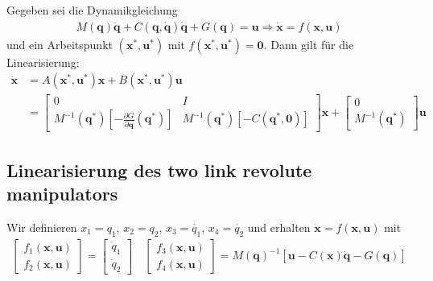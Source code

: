 \documentclass[a4paper, 12pt]{scrartcl}
\begin{document}
\begin{satz}
    Gegeben sei die Dynamikgleichung
    \begin{align*}
        M(\bm{q}) \ddot{\bm{q}} 
        + C(\bm{q}, \dot{\bm{q}}) \dot{\bm{q}} 
        + G(\bm{q}) = \bm{u}
        \Rightarrow
        \dot{\bm{x}} = f(\bm{x}, \bm{u})
    \end{align*}
    und ein Arbeitspunkt $(\bm{x}^*, \bm{u}^*)$ mit $f(\bm{x}^*, \bm{u}^*) = \bm{0}$. 
    Dann gilt für die Linearisierung:
    \begin{align*}
        \dot{\bm{x}}
        &=
        A(\bm{x}^*, \bm{u}^*) \bm{x} + B(\bm{x}^*, \bm{u}^*) \bm{u} \\
        &=
        \begin{bmatrix}
            0 & I \\
            M^{-1}(\bm{q}^*) 
            \left[
                -\frac{\partial G}{\partial \bm{q}}(\bm{q}^*) 
            \right]
            & 
            M^{-1}(\bm{q}^*) 
            \left[
                -C(\bm{q}^*,\bm{0})
            \right]
        \end{bmatrix} 
        \bm{x} +
        \begin{bmatrix}
            0 \\[6pt]
            M^{-1}(\bm{q}^*)
        \end{bmatrix}
        \bm{u}
    \end{align*}
\end{satz}

\subsection{Linearisierung des two link revolute manipulators}

Wir definieren  $x_1 = q_1$, $x_2 = q_2$, $x_3 = \dot{q_1}$, $x_4 = \dot{q_2}$  
und erhalten $\dot{\bm{x}} = f(\bm{x},\bm{u})$ mit
\begin{align*}
    \begin{bmatrix}
        f_1(\bm{x},\bm{u})  \\
        f_2(\bm{x},\bm{u}) 
    \end{bmatrix} 
    =
    \begin{bmatrix}
        \dot{q}_1 \\
        \dot{q}_2
    \end{bmatrix}
    \quad
    \begin{bmatrix}
        f_3(\bm{x},\bm{u}) \\
        f_4(\bm{x},\bm{u}) 
    \end{bmatrix}
    =
    M(\bm{q})^{-1}
    \left[ 
        \bm{u} - C(\bm{x}) 
        \dot{\bm{q}}
        - G(\bm{q}) 
    \right]
\end{align*}
\end{document}
